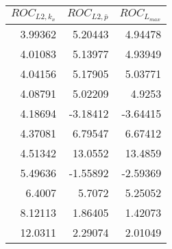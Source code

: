 \begin{tabular}{rrr}
\toprule
$ROC_{L{2,{k_x}}}$ & $ROC_{L{2,\bar{p}}}$ & $ROC_{L_{max}}$ \\
\midrule
3.99362 & 5.20443 & 4.94478 \\
4.01083 & 5.13977 & 4.93949 \\
4.04156 & 5.17905 & 5.03771 \\
4.08791 & 5.02209 & 4.9253 \\
4.18694 & -3.18412 & -3.64415 \\
4.37081 & 6.79547 & 6.67412 \\
4.51342 & 13.0552 & 13.4859 \\
5.49636 & -1.55892 & -2.59369 \\
6.4007 & 5.7072 & 5.25052 \\
8.12113 & 1.86405 & 1.42073 \\
12.0311 & 2.29074 & 2.01049 \\
\bottomrule
\end{tabular}
